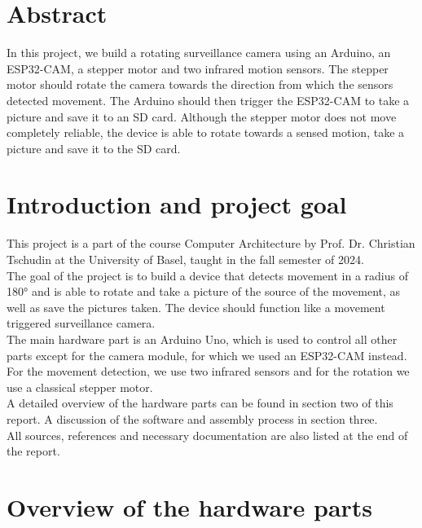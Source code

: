 \documentclass{article}
\begin{document}


\tableofcontents

\newpage

\section*{Abstract}

In this project, we build a rotating surveillance camera using an Arduino, an ESP32-CAM, a stepper motor and two infrared motion sensors. The stepper motor should rotate the camera towards the direction from which the sensors detected movement. The Arduino should then trigger the ESP32-CAM to take a picture and save it to an SD card. Although the stepper motor does not move completely reliable, the device is able to rotate towards a sensed motion, take a picture and save it to the SD card.

\newpage

\section{Introduction and project goal}

This project is a part of the course Computer Architecture by Prof. Dr. Christian Tschudin at the University of Basel, taught in the fall semester of 2024.\\
The goal of the project is to build a device that detects movement in a radius of 180° and is able to rotate and take a picture of the source of the movement, as well as save the pictures taken. The device should function like a movement triggered surveillance camera.\\
The main hardware part is an Arduino Uno, which is used to control all other parts except for the camera module, for which we used an ESP32-CAM instead. For the movement detection, we use two infrared sensors and for the rotation we use a classical stepper motor.\\
A detailed overview of the hardware parts can be found in section two of this report. A discussion of the software and assembly process in section three.\\
All sources, references and necessary documentation are also listed at the end of the report.

\section{Overview of the hardware parts}
\end{document}
